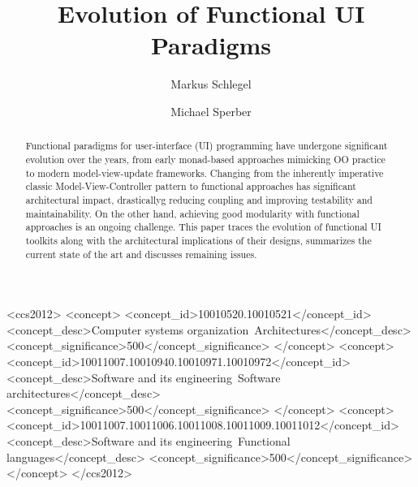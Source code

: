 \documentclass[sigplan,screen]{acmart}
\begin{document}
\title{Evolution of Functional UI Paradigms}

\author{Markus Schlegel}

\author{Michael Sperber}

\begin{abstract}
  Functional paradigms for user-interface (UI) programming have
  undergone significant evolution over the years, from early
  monad-based approaches mimicking OO practice to modern
  model-view-update frameworks.  Changing from the inherently
  imperative classic Model-View-Controller pattern to functional
  approaches has significant architectural impact, drasticallyg
  reducing coupling and improving testability and maintainability.  On
  the other hand, achieving good modularity with functional approaches
  is an ongoing challenge.  This paper traces the evolution of
  functional UI toolkits along with the architectural implications of
  their designs, summarizes the current state of the art and discusses
  remaining issues.
\end{abstract}

\begin{CCSXML}
<ccs2012>
   <concept>
       <concept_id>10010520.10010521</concept_id>
       <concept_desc>Computer systems organization~Architectures</concept_desc>
       <concept_significance>500</concept_significance>
       </concept>
   <concept>
       <concept_id>10011007.10010940.10010971.10010972</concept_id>
       <concept_desc>Software and its engineering~Software architectures</concept_desc>
       <concept_significance>500</concept_significance>
       </concept>
   <concept>
       <concept_id>10011007.10011006.10011008.10011009.10011012</concept_id>
       <concept_desc>Software and its engineering~Functional languages</concept_desc>
       <concept_significance>500</concept_significance>
       </concept>
 </ccs2012>
\end{CCSXML}
\end{document}
